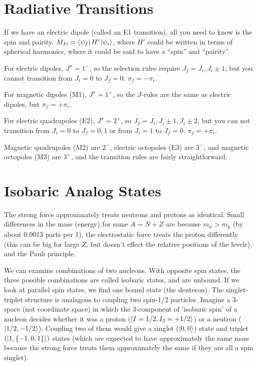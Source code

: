 \documentclass[a4paper,twoside,master.tex]{subfiles}
\begin{document}

\section{Radiative Transitions}\label{sec:radiative_transitions}


If we have an electric dipole (called an E1 transition), all you need to know is the spin and pairity. $ M_{f i} =\bra{\psi_f} H'\ket{\psi_i} $, where $ H' $ could be written in terms of spherical harmonics, where it could be said to have a ``spin'' and ``pairity''.

For electric dipoles, $ J^{\pi} = 1^- $, so the selection rules require $ J_f = J_i, J_i \pm 1 $, but you cannot transition from $ J_i = 0 $ to $ J_f = 0 $. $ \pi_f = - \pi_i $.

For magnetic dipoles (M1), $ J^{\pi} = 1^+ $, so the $ J $-rules are the same as electric dipoles, but $ \pi_f = + \pi_i $.

For electric quadrupoles (E2), $ J^{\pi} = 2^+ $, so $ J_f = J_i, J_i \pm 1, J_i \pm 2 $, but you can not transition from $ J_i = 0 $ to $ J_f = 0, 1 $ or from $ J_i = 1 $ to $ J_f = 0 $. $ \pi_f = + \pi_i $.

Magnetic quadrupoles (M2) are $ 2^- $, electric octopoles (E3) are $ 3^- $, and magnetic octopoles (M3) are $ 3^+ $, and the transition rules are fairly straightforward.

\section{Isobaric Analog States}\label{sec:isobaric_analog_states}

The strong force approximately treats neutrons and protons as identical. Small differences in the mass (energy) for same $ A = N + Z $ are because $ m_n > m_p $ (by about $ 0.0013 $ parts per $ 1 $), the electrostatic force treats the proton differently (this can be big for large $ Z $, but doesn't effect the relative positions of the levels), and the Pauli principle.

We can examine combinations of two nucleons. With opposite spin states, the three possible combinations are called isobaric states, and are unbound. If we look at parallel spin states, we find one bound state (the deuteron). The singlet-triplet structure is analagous to coupling two spin-1/2 particles. Imagine a 3-space (not coordinate space) in which the 3-component of 'isobaric spin' of a nucleon decides whether it was a proton ($\ket{I = 1/2, I_3 = +1/2} $) or a neutron ($\ket{1/2, -1/2} $). Coupling two of them would give a singlet ($\ket{0,0} $) state and triplet $ (\ket{1, \{-1,0,1\}}) $ states (which are expected to have approximately the same mass because the strong force treats them approximately the same if they are all a spin singlet).
\end{document}
